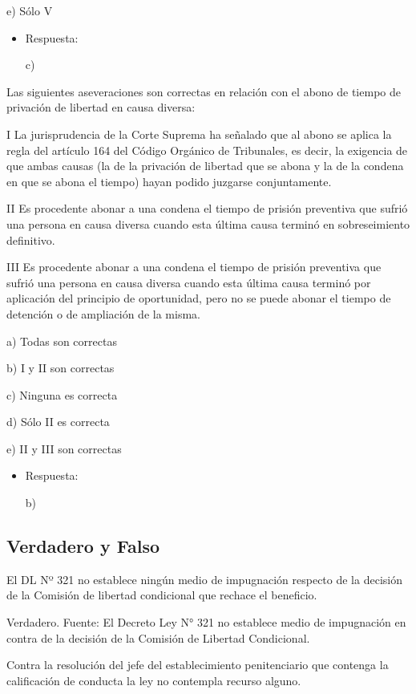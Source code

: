 \documentclass[letterpaper, 11pt]{article}
\begin{document}
e) Sólo V

\begin{itemize}
\item Respuesta:

c)
\end{itemize}


Las siguientes aseveraciones son correctas en relación con el abono de
tiempo de privación de libertad en causa diversa:


I La jurisprudencia de la Corte Suprema ha señalado que al abono se
aplica la regla del artículo 164 del Código Orgánico de Tribunales, es
decir, la exigencia de que ambas causas (la de la privación de
libertad que se abona y la de la condena en que se abona el tiempo)
hayan podido juzgarse conjuntamente.


II Es procedente abonar a una condena el tiempo de prisión preventiva
que sufrió una persona en causa diversa cuando esta última causa
terminó en sobreseimiento definitivo.

III Es procedente abonar a una condena el tiempo de prisión preventiva
que sufrió una persona en causa diversa cuando esta última causa
terminó por aplicación del principio de oportunidad, pero no se puede
abonar el tiempo de detención o de ampliación de la misma.


a) Todas son correctas

b) I y II son correctas

c) Ninguna es correcta

d) Sólo II es correcta

e) II y III son correctas

\begin{itemize}
\item Respuesta:

b)
\end{itemize}

\subsection{Verdadero y Falso}
\label{sec:orgac7bd30}

El DL Nº 321 no establece ningún medio de impugnación respecto de la decisión de la
Comisión de libertad condicional que rechace el beneficio.

Verdadero.
Fuente: El Decreto Ley N° 321 no establece medio de impugnación en contra de la decisión
de la Comisión de Libertad Condicional.

Contra la resolución del jefe del establecimiento penitenciario que contenga la
calificación de conducta la ley no contempla recurso alguno.
\end{document}
